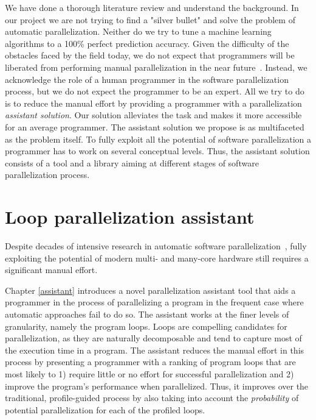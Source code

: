 We have done a thorough literature review and understand the background. In our project we are not trying to find a "silver bullet" and solve the problem of automatic parallelization. Neither do we try to tune a machine learning algorithms to a 100\% perfect prediction accuracy. Given the difficulty of the obstacles faced by the field today, we do not expect that programmers will be liberated from performing manual parallelization in the near future~\cite{Larsen:2012:PML:2410141.2410600}. Instead, we acknowledge the role of a human programmer in the software parallelization process, but we do not expect the programmer to be an expert. All we try to do is to reduce the manual effort by providing a programmer with a parallelization \textit{assistant solution}. Our solution alleviates the task and makes it more accessible for an average programmer. The assistant solution we propose is as multifaceted as the problem itself. To fully exploit all the potential of software parallelization a programmer has to work on several conceptual levels. Thus, the assistant solution consists of a tool and a library aiming at different stages of software parallelization process. 

\section{Loop parallelization assistant}
\label{introduction_assistant}


\quad Despite decades of intensive research in automatic software
parallelization~\cite{6813266}, fully exploiting the potential of modern multi- and many-core hardware still requires a significant manual effort.


Chapter \ref{assistant} introduces a novel parallelization assistant tool that aids a programmer in the process of parallelizing a program in the frequent case where automatic approaches fail to do so. The assistant works at the finer levels of granularity, namely the program loops. Loops are compelling candidates for parallelization, as they are naturally decomposable and tend to capture most of the execution time in a program.
%
The assistant reduces the manual effort in this process by presenting a programmer with a ranking of program loops that are most likely to 1) require little or no effort for successful parallelization and 2) improve the program's performance when parallelized.
%
Thus, it improves over the traditional, profile-guided process by also taking into account the \emph{probability} of potential parallelization for each of the profiled loops.

